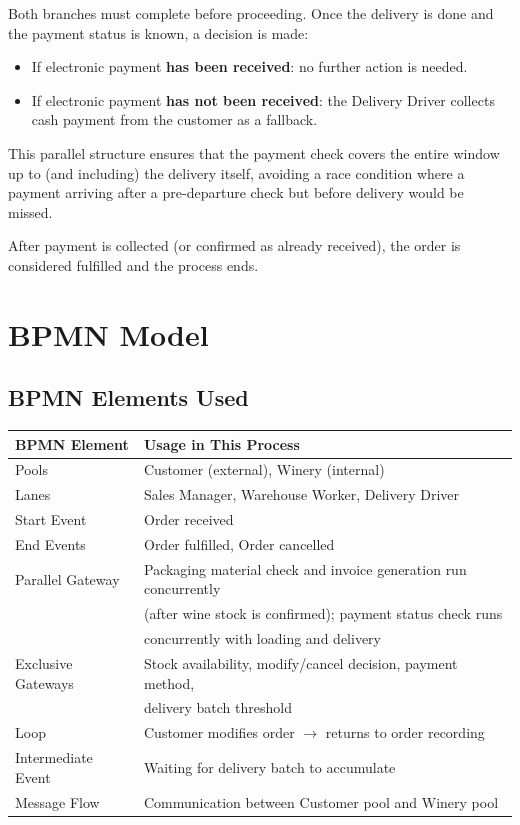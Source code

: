\documentclass[11pt,a4paper]{article}
\begin{document}
Both branches must complete before proceeding. Once the delivery is done and the payment status is known, a decision is made:
\begin{itemize}
    \item If electronic payment \textbf{has been received}: no further action is needed.
    \item If electronic payment \textbf{has not been received}: the Delivery Driver collects cash payment from the customer as a fallback.
\end{itemize}

This parallel structure ensures that the payment check covers the entire window up to (and including) the delivery itself, avoiding a race condition where a payment arriving after a pre-departure check but before delivery would be missed.

After payment is collected (or confirmed as already received), the order is considered fulfilled and the process ends.

\section{BPMN Model}

\subsection{BPMN Elements Used}

\begin{table}[H]
\centering
\begin{tabular}{@{}ll@{}}
\toprule
\textbf{BPMN Element} & \textbf{Usage in This Process} \\
\midrule
Pools              & Customer (external), Winery (internal) \\
Lanes              & Sales Manager, Warehouse Worker, Delivery Driver \\
Start Event        & Order received \\
End Events         & Order fulfilled, Order cancelled \\
Parallel Gateway   & Packaging material check and invoice generation run concurrently \\
                   & (after wine stock is confirmed); payment status check runs \\
                   & concurrently with loading and delivery \\
Exclusive Gateways & Stock availability, modify/cancel decision, payment method, \\
                   & delivery batch threshold \\
Loop               & Customer modifies order $\rightarrow$ returns to order recording \\
Intermediate Event & Waiting for delivery batch to accumulate \\
Message Flow       & Communication between Customer pool and Winery pool \\
\bottomrule
\end{tabular}
\end{table}
\end{document}
